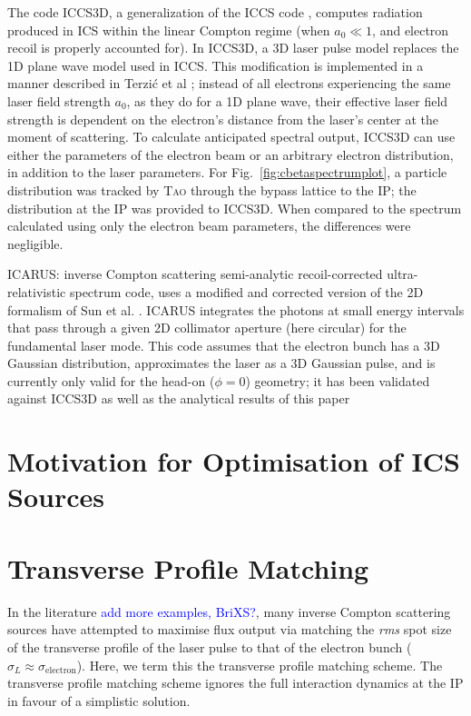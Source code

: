 \documentclass[../main.tex]{subfiles}
\begin{document}
The code \textsc{ICCS3D}, a generalization of the \textsc{ICCS} code \cite{krafft2016laser,ranjan2018simulation}, computes radiation produced in ICS within the linear Compton regime (when $a_{0}\ll 1$, and electron recoil is properly accounted for). In \textsc{ICCS3D}, a 3D laser pulse model replaces the 1D plane wave model used in \textsc{ICCS}. This modification is implemented in a manner described in Terzi\'c et al \cite{terzic2019improving}; instead of all electrons experiencing the same laser field strength $a_{0}$, as they do for a 1D plane wave, their effective laser field strength is dependent on the electron's distance from the laser's center at the moment of scattering. To calculate anticipated spectral output, \textsc{ICCS3D} can use either the parameters of the electron beam or an arbitrary electron distribution, in addition to the laser parameters. For Fig.~\ref{fig:cbetaspectrumplot}, a particle distribution was tracked by \textsc{Tao} \cite{TaoManual} through the bypass lattice to the IP; the distribution at the IP was provided to \textsc{ICCS3D}. When compared to the spectrum calculated using only the electron beam parameters, the differences were negligible. 



\textsc{ICARUS}: inverse Compton scattering semi-analytic recoil-corrected ultra-relativistic spectrum code, uses a modified and corrected  version of the 2D formalism of Sun et al. \cite{sun2011theoretical}. \textsc{ICARUS} integrates the photons at small energy intervals that pass through a given 2D collimator aperture (here circular) for the fundamental laser mode. This code assumes that the electron bunch has a 3D Gaussian distribution, approximates the laser as a 3D Gaussian pulse, and is currently only valid for the head-on ($\phi = 0$) geometry; it has been validated against \textsc{ICCS3D} as well as the analytical results of this paper

\section{Motivation for Optimisation of ICS Sources}

\section{Transverse Profile Matching}

In the literature \cite{akagi2016narrow,deitrick2018high,jacquet2015radiation} \textcolor{blue}{add more examples, BriXS?}, many inverse Compton scattering sources have attempted to maximise flux output via matching the \textit{rms} spot size of the transverse profile of the laser pulse to that of the electron bunch ($\sigma_{L}\approx\sigma_{\mathrm{electron}}$). Here, we term this the transverse profile matching scheme. The transverse profile matching scheme ignores the full interaction dynamics at the IP in favour of a simplistic solution. 
\end{document}
